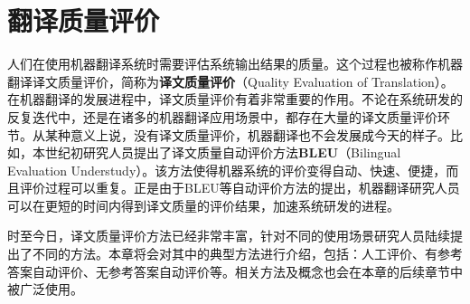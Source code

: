 
%


\renewcommand\figurename{图}%
\renewcommand\tablename{表}%


\chapter{翻译质量评价}

\parinterval 人们在使用机器翻译系统时需要评估系统输出结果的质量。这个过程也被称作机器翻译译文质量评价，简称为{\small\sffamily\bfseries{译文质量评价}}（Quality Evaluation of Translation）。在机器翻译的发展进程中，译文质量评价有着非常重要的作用。不论在系统研发的反复迭代中，还是在诸多的机器翻译应用场景中，都存在大量的译文质量评价环节。从某种意义上说，没有译文质量评价，机器翻译也不会发展成今天的样子。比如，本世纪初研究人员提出了译文质量自动评价方法{\small\sffamily\bfseries{BLEU}}（Bilingual Evaluation Understudy）。该方法使得机器系统的评价变得自动、快速、便捷，而且评价过程可以重复。正是由于BLEU等自动评价方法的提出，机器翻译研究人员可以在更短的时间内得到译文质量的评价结果，加速系统研发的进程。

\parinterval 时至今日，译文质量评价方法已经非常丰富，针对不同的使用场景研究人员陆续提出了不同的方法。本章将会对其中的典型方法进行介绍，包括：人工评价、有参考答案自动评价、无参考答案自动评价等。相关方法及概念也会在本章的后续章节中被广泛使用。


